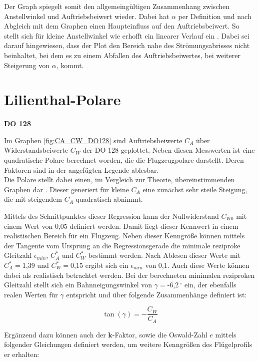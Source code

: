 Der Graph spiegelt somit den allgemeingültigen Zusammenhang zwischen Anstellwinkel und Auftriebsbeiwert wieder. Dabei hat $\alpha$ per Definition und nach Abgleich mit dem Graphen einen Haupteinfluss auf den Auftriebsbeiwert. So stellt sich für kleine Anstellwinkel wie erhofft ein linearer Verlauf ein \cite{Skript}. Dabei sei darauf hingewiesen, dass der Plot den Bereich nahe des Strömungsabrisses nicht beinhaltet, bei dem es zu einem Abfallen des Auftriebsbeiwertes, bei weiterer Steigerung von $\alpha$, kommt.

\section{Lilienthal-Polare}

\textbf{DO 128}

Im Graphen \ref{fig:CA_CW_DO128} sind  Auftriebsbeiwerte $C_A$ über Widerstandsbeiwerte $C_W$ der DO 128 geplottet. Neben diesen Messwerten ist eine quadratische Polare berechnet worden, die die Flugzeugpolare darstellt. Deren Faktoren sind in der angefügten Legende ablesbar. \\ Die Polare stellt dabei einen, im Vergleich zur Theorie, übereinstimmenden Graphen dar \cite{Kurzskript}. Dieser generiert für kleine $C_A$ eine zunächst sehr steile Steigung, die mit steigendem $C_A$ quadratisch abnimmt. 

Mittels des Schnittpunktes dieser Regression kann der Nullwiderstand $C_{W0}$ mit einem Wert von 0,05 definiert werden. Damit liegt dieser Kennwert in einem realistischen Bereich für ein Flugzeug. Neben dieser Kenngröße können mittels der Tangente vom Ursprung an die Regressionsgerade die minimale reziproke Gleitzahl $\epsilon_{min}$, $C_A^*$ und $C_W^*$ bestimmt werden. Nach Ablesen dieser Werte mit $C_A^*=$1,39 und $C_W^*=$0,15 ergibt sich ein $\epsilon_{min}$ von 0,1. Auch diese Werte können dabei als realistisch betrachtet werden. Bei der berechneten minimalen reziproken Gleitzahl stellt sich ein Bahnneigungswinkel von $\gamma=$-6,2$^{\ \circ}$ ein, der ebenfalls realen Werten für $\gamma$ entspricht und über folgende Zusammenhänge definiert ist:

\begin{equation}
\tan\left(\gamma\right)=-\frac{C_W}{C_A}
\end{equation}

Ergänzend dazu können auch der $\textbf{k}$-Faktor, sowie die Oswald-Zahl $e$ mittels folgender Gleichungen definiert werden, um weitere Kenngrößen des Flügelprofils er erhalten:

